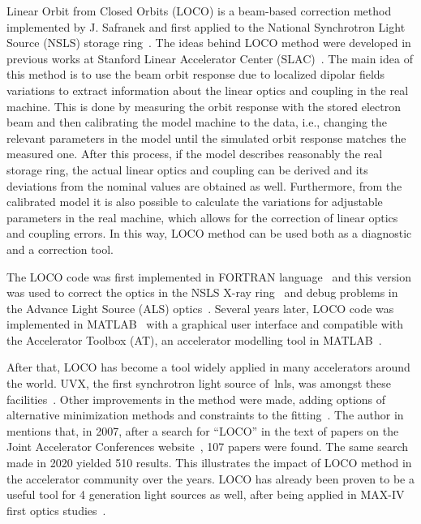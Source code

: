 Linear Orbit from Closed Orbits (LOCO) is a beam-based correction method implemented by J. Safranek and first applied to the National Synchrotron Light Source (NSLS) storage ring~\cite{safranek1994, safranek1995, safranek1997}. The ideas behind LOCO method were developed in previous works at Stanford Linear Accelerator Center (SLAC)~\cite{martin1992, corbett1993}. The main idea of this method is to use the beam orbit response due to localized dipolar fields variations to extract information about the linear optics and coupling in the real machine. This is done by measuring the orbit response with the stored electron beam and then calibrating the model machine to the data, i.e., changing the relevant parameters in the model until the simulated orbit response matches the measured one. After this process, if the model describes reasonably the real storage ring, the actual linear optics and coupling can be derived and its deviations from the nominal values are obtained as well. Furthermore, from the calibrated model it is also possible to calculate the variations for adjustable parameters in the real machine, which allows for the correction of linear optics and coupling errors. In this way, LOCO method can be used both as a diagnostic and a correction tool.

The LOCO code was first implemented in FORTRAN language~\cite{icfa_safranek} and this version was used to correct the optics in the NSLS X-ray ring~\cite{safranek1997} and debug problems in the Advance Light Source (ALS) optics~\cite{robin1996}. Several years later, LOCO code was implemented in MATLAB~\cite{safranek2002, icfa_greg} with a graphical user interface and compatible with the Accelerator Toolbox (AT), an accelerator modelling tool in MATLAB~\cite{terebilo2001}. 

After that, LOCO has become a tool widely applied in many accelerators around the world. UVX, the first synchrotron light source of~\gls{lnls}, was amongst these facilities~\cite{resende2010}. Other improvements in the method were made, adding options of alternative minimization methods and constraints to the fitting~\cite{icfa_huang}. The author in~\cite{icfa_safranek} mentions that, in 2007, after a search for ``LOCO'' in the text of papers on the Joint Accelerator Conferences website~\cite{jacow}, 107 papers were found. The same search made in 2020 yielded 510 results. This illustrates the impact of LOCO method in the accelerator community over the years. LOCO has already been proven to be a useful tool for 4 generation light sources as well, after being applied in MAX-IV first optics studies~\cite{leemann2017}.

